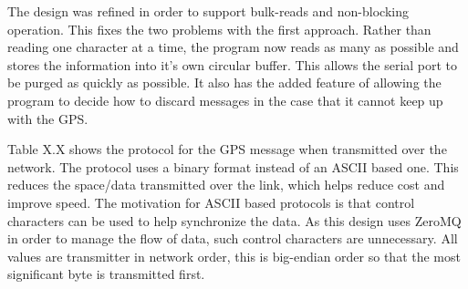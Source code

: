 The design was refined in order to support bulk-reads and non-blocking operation. This fixes the two problems with the first approach. Rather than reading one character at a time, the program now reads as many as possible and stores the information into it’s own circular buffer. This allows the serial port to be purged as quickly as possible. It also has the added feature of allowing the program to decide how to discard messages in the case that it cannot keep up with the GPS.

Table X.X shows the protocol for the GPS message when transmitted over the network. The protocol uses a binary format instead of an ASCII based one. This reduces the space/data transmitted over the link, which helps reduce cost and improve speed. The motivation for ASCII based protocols is that control characters can be used to help synchronize the data. As this design uses ZeroMQ in order to manage the flow of data, such control characters are unnecessary. All values are transmitter in network order, this is big-endian order so that the most significant byte is transmitted first.





